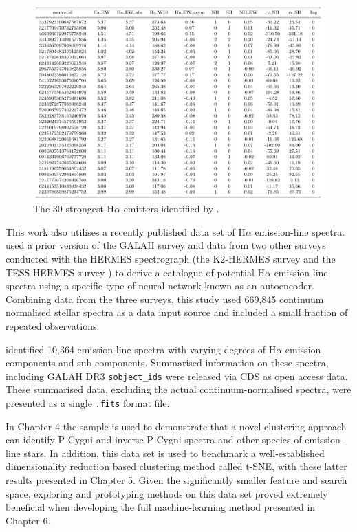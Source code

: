 \begin{figure}[!htb]
\centering
\includegraphics[scale=.45]{figures/cotartable.png}
\caption{The 30 strongest H$\alpha$ emitters identified by \citet{vcotar2021galah}.}
\end{figure}

This work also utilises a recently published data set of H$\alpha$ emission-line spectra. \citet{vcotar2021galah} used a prior version of the GALAH survey \citep{de2015galah} and data from two other surveys conducted with the HERMES spectrograph (the K2-HERMES survey \citep{wittenmyer2018k2} and the TESS-HERMES survey \citep{sharma2018tess}) to derive a catalogue of potential H$\alpha$ emission-line spectra using a specific type of neural network known as an autoencoder. Combining data from the three surveys, this study used 669,845 continuum normalised stellar spectra as a data input source and included a small fraction of repeated observations. 

\citet{vcotar2021galah} identified 10,364 emission-line spectra with varying degrees of H$\alpha$ emission components and sub-components. Summarised information on these spectra, including GALAH DR3 \texttt{sobject\_ids} were released via \href{https://cdsweb.u-strasbg.fr/}{CDS} as open access data. These summarised data, excluding the actual continuum-normalised spectra, were presented as a single \texttt{.fits} format file. 

In Chapter 4 the \citet{vcotar2021galah} sample is used to demonstrate that a novel clustering approach can identify P Cygni and inverse P Cygni spectra and other species of emission-line stars. In addition, this data set is used to benchmark a well-established dimensionality reduction based clustering method called t-SNE, with these latter results presented in Chapter 5. Given the significantly smaller feature and search space, exploring and prototyping methods on this data set proved extremely beneficial when developing the full machine-learning method presented in Chapter 6.

